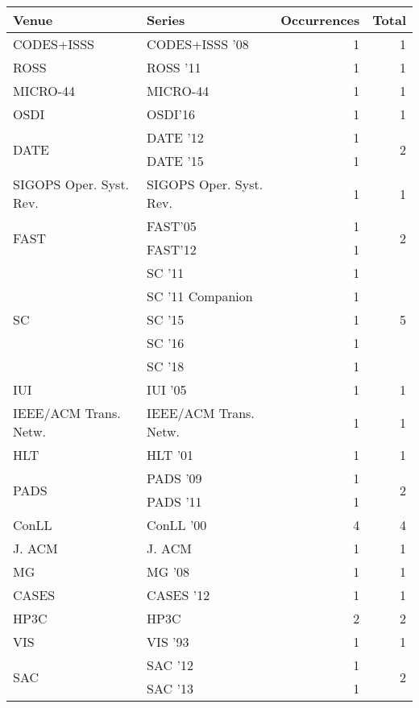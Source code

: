 \begin{table*}[t]
\begin{tabular}{llrr}
Venue & Series & Occurrences & Total\\\hline
\multirow{1}{*}{CODES+ISSS } & CODES+ISSS '08 & 1 & \multirow{1}{*}{1}\\
\multirow{1}{*}{ROSS } & ROSS '11 & 1 & \multirow{1}{*}{1}\\
\multirow{1}{*}{MICRO-44} & MICRO-44 & 1 & \multirow{1}{*}{1}\\
\multirow{1}{*}{OSDI} & OSDI'16 & 1 & \multirow{1}{*}{1}\\
\multirow{2}{*}{DATE } & DATE '12 & 1 & \multirow{2}{*}{2}\\
& DATE '15 & 1 &\\
\multirow{1}{*}{SIGOPS Oper. Syst. Rev.} & SIGOPS Oper. Syst. Rev. & 1 & \multirow{1}{*}{1}\\
\multirow{2}{*}{FAST} & FAST'05 & 1 & \multirow{2}{*}{2}\\
& FAST'12 & 1 &\\
\multirow{5}{*}{SC } & SC '11 & 1 & \multirow{5}{*}{5}\\
& SC '11 Companion & 1 &\\
& SC '15 & 1 &\\
& SC '16 & 1 &\\
& SC '18 & 1 &\\
\multirow{1}{*}{IUI } & IUI '05 & 1 & \multirow{1}{*}{1}\\
\multirow{1}{*}{IEEE/ACM Trans. Netw.} & IEEE/ACM Trans. Netw. & 1 & \multirow{1}{*}{1}\\
\multirow{1}{*}{HLT } & HLT '01 & 1 & \multirow{1}{*}{1}\\
\multirow{2}{*}{PADS } & PADS '09 & 1 & \multirow{2}{*}{2}\\
& PADS '11 & 1 &\\
\multirow{1}{*}{ConLL } & ConLL '00 & 4 & \multirow{1}{*}{4}\\
\multirow{1}{*}{J. ACM} & J. ACM & 1 & \multirow{1}{*}{1}\\
\multirow{1}{*}{MG } & MG '08 & 1 & \multirow{1}{*}{1}\\
\multirow{1}{*}{CASES } & CASES '12 & 1 & \multirow{1}{*}{1}\\
\multirow{1}{*}{HP3C} & HP3C & 2 & \multirow{1}{*}{2}\\
\multirow{1}{*}{VIS } & VIS '93 & 1 & \multirow{1}{*}{1}\\
\multirow{2}{*}{SAC } & SAC '12 & 1 & \multirow{2}{*}{2}\\
& SAC '13 & 1 &\\

\end{tabular}
\end{table*}
